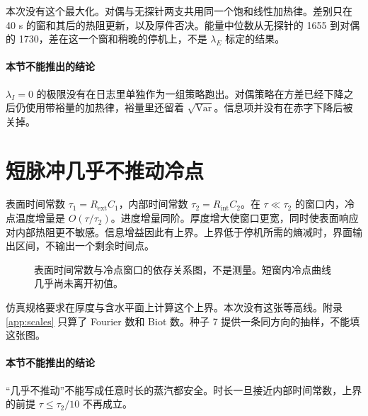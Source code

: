 本次没有这个最大化。对偶与无探针两支共用同一个饱和线性加热律。差别只在 40 s 的窗和其后的热阻更新，以及厚件否决。能量中位数从无探针的 1655 到对偶的 1730，差在这一个窗和稍晚的停机上，不是 \(\lambda_E\) 标定的结果。

\paragraph{本节不能推出的结论}
\(\lambda_I=0\) 的极限没有在日志里单独作为一组策略跑出。对偶策略在方差已经下降之后仍使用带裕量的加热律，裕量里还留着 \(\sqrt{\mathrm{Var}}\)。信息项并没有在赤字下降后被关掉。

\section{短脉冲几乎不推动冷点}

表面时间常数 \(\tau_1=R_{\mathrm{ext}}C_1\)，内部时间常数 \(\tau_2=R_{\mathrm{int}}C_2\)。在 \(\tau\ll\tau_2\) 的窗口内，冷点温度增量是 \(O(\tau/\tau_2)\)。进度增量同阶。厚度增大使窗口更宽，同时使表面响应对内部热阻更不敏感。信息增益因此有上界。上界低于停机所需的熵减时，界面输出区间，不输出一个剩余时间点。

\begin{figure}[ht]
\centering
{}
\caption{表面时间常数与冷点窗口的依存关系图，不是测量。短窗内冷点曲线几乎尚未离开初值。}
\end{figure}

仿真规格要求在厚度与含水平面上计算这个上界。本次没有这张等高线。附录 \ref{app:scales} 只算了 Fourier 数和 Biot 数。种子 7 提供一条同方向的抽样，不能填这张图。

\paragraph{本节不能推出的结论}
“几乎不推动”不能写成任意时长的蒸汽都安全。时长一旦接近内部时间常数，上界的前提 \(\tau\le\tau_2/10\) 不再成立。
